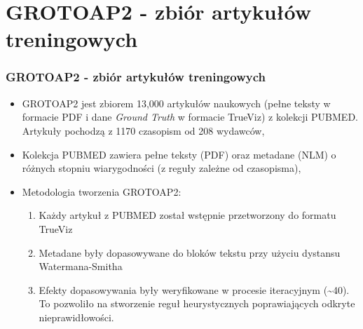 \documentclass[11pt,t]{beamer}
\begin{document}
\section{GROTOAP2 - zbiór artykułów treningowych}
\begin{frame}
\frametitle{GROTOAP2 - zbiór artykułów treningowych}
\begin{itemize}
\item GROTOAP2 jest zbiorem 13,000 artykułów naukowych (pełne teksty w formacie PDF i dane \textit{Ground Truth} w formacie TrueViz) z kolekcji PUBMED. Artykuły pochodzą z 1170 czasopism od 208 wydawców,
\item Kolekcja PUBMED zawiera pełne teksty (PDF) oraz metadane (NLM) o różnych stopniu wiarygodności (z reguły zależne od czasopisma),
\item Metodologia tworzenia GROTOAP2:
\begin{enumerate}
\item Każdy artykuł z PUBMED został wstępnie przetworzony do formatu TrueViz
\item Metadane były dopasowywane do bloków tekstu przy użyciu dystansu Watermana-Smitha
\item Efekty dopasowywania były weryfikowane w procesie iteracyjnym (\textasciitilde 40). To pozwoliło na stworzenie reguł heurystycznych poprawiających odkryte nieprawidłowości.
\end{enumerate}

\end{itemize}

\end{frame}

\end{document}
